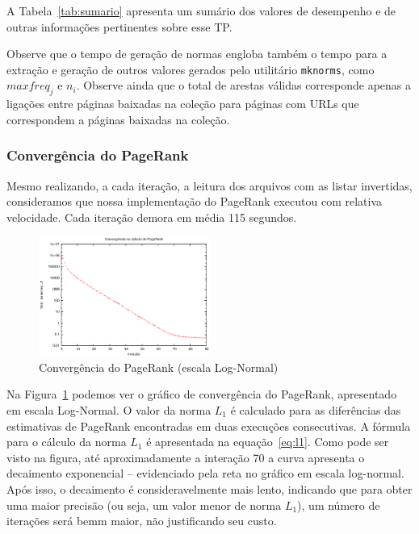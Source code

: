 \documentclass[10pt,twocolumn]{article}
\begin{document}
A Tabela~\ref{tab:sumario} apresenta um sumário dos valores de
desempenho e de outras informações pertinentes sobre esse TP.

Observe que o tempo de geração de normas engloba também o 
tempo para a extração e geração de outros valores gerados pelo
utilitário \texttt{mknorms}, como \(maxfreq_j\) e \(n_i\). Observe ainda
que o total de arestas válidas corresponde apenas a ligações entre
páginas baixadas na coleção para páginas com URLs que correspondem a
páginas baixadas na coleção.

\subsubsection{Convergência do PageRank}

Mesmo realizando, a cada iteração, a leitura dos arquivos com as listar
invertidas, consideramos que nossa implementação do PageRank executou
com relativa velocidade. Cada iteração demora em média 115 segundos.

\begin{figure}[htb]
\begin{center}
\includegraphics[width=0.5\textwidth]{plot_pagerankconverge}
\end{center}
\caption{Convergência do PageRank (escala Log-Normal)}
\label{fig:converge}
\end{figure}

Na Figura~\ref{fig:converge} podemos ver o gráfico de convergência do
PageRank, apresentado em escala Log-Normal. O valor da norma \(L_1\) é
calculado para as diferências das estimativas de PageRank encontradas em
duas execuções consecutivas. A fórmula para o cálculo da norma \(L_1\) é
apresentada na equação~\ref{eq:l1}. Como pode ser visto na figura, até
aproximadamente a interação 70 a curva apresenta o decaimento
exponencial -- evidenciado pela reta no gráfico em escala
log-normal. Após isso, o decaimento é consideravelmente mais lento,
indicando que para obter uma maior precisão (ou seja, um valor menor de
norma \(L_1\)), um número de iterações será bemm maior, não justificando
seu custo.
\end{document}
